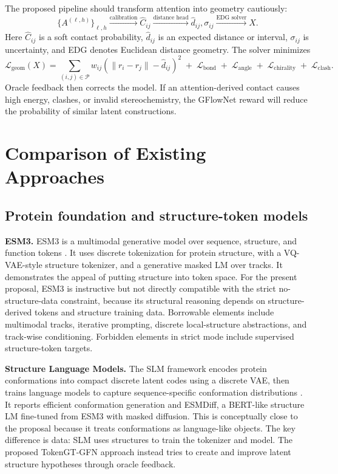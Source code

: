 \documentclass[11pt]{article}
\begin{document}
The proposed pipeline should transform attention into geometry cautiously:
\[
\{A^{(\ell,h)}\}_{\ell,h}
\xrightarrow{\text{calibration}}
\hat{C}_{ij}
\xrightarrow{\text{distance head}}
\hat{d}_{ij},\sigma_{ij}
\xrightarrow{\text{EDG solver}}
X.
\]
Here $\hat{C}_{ij}$ is a soft contact probability, $\hat{d}_{ij}$ is an expected distance or interval, $\sigma_{ij}$ is uncertainty, and EDG denotes Euclidean distance geometry. The solver minimizes
\[
\mathcal{L}_{\mathrm{geom}}(X)
=
\sum_{(i,j)\in\mathcal{P}}
w_{ij}\left(\|r_i-r_j\|-\hat{d}_{ij}\right)^2
\;+\;\mathcal{L}_{\mathrm{bond}}
\;+\;\mathcal{L}_{\mathrm{angle}}
\;+\;\mathcal{L}_{\mathrm{chirality}}
\;+\;\mathcal{L}_{\mathrm{clash}}.
\]
Oracle feedback then corrects the model. If an attention-derived contact causes high energy, clashes, or invalid stereochemistry, the GFlowNet reward will reduce the probability of similar latent constructions.

\section{Comparison of Existing Approaches}

\subsection{Protein foundation and structure-token models}

\textbf{ESM3.} ESM3 is a multimodal generative model over sequence, structure, and function tokens \cite{hayes2024esm3}. It uses discrete tokenization for protein structure, with a VQ-VAE-style structure tokenizer, and a generative masked LM over tracks. It demonstrates the appeal of putting structure into token space. For the present proposal, ESM3 is instructive but not directly compatible with the strict no-structure-data constraint, because its structural reasoning depends on structure-derived tokens and structure training data. Borrowable elements include multimodal tracks, iterative prompting, discrete local-structure abstractions, and track-wise conditioning. Forbidden elements in strict mode include supervised structure-token targets.

\textbf{Structure Language Models.} The SLM framework encodes protein conformations into compact discrete latent codes using a discrete VAE, then trains language models to capture sequence-specific conformation distributions \cite{lu2025slm}. It reports efficient conformation generation and ESMDiff, a BERT-like structure LM fine-tuned from ESM3 with masked diffusion. This is conceptually close to the proposal because it treats conformations as language-like objects. The key difference is data: SLM uses structures to train the tokenizer and model. The proposed TokenGT-GFN approach instead tries to create and improve latent structure hypotheses through oracle feedback.
\end{document}
